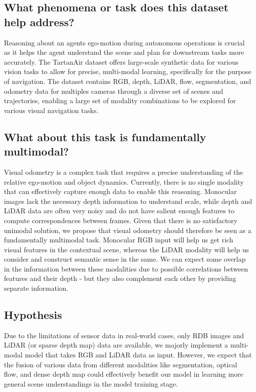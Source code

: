\documentclass[11pt,a4paper]{article}
\begin{document}
\subsection{What phenomena or task does this dataset help address?}
Reasoning about an agents ego-motion during autonomous operations is crucial as it helps the agent understand the scene and plan for downstream tasks more accurately. %
The TartanAir dataset offers large-scale synthetic data for various vision tasks to allow for precise, multi-modal learning, specifically for the purpose of navigation. The dataset contains RGB, depth, LiDAR, flow, segmentation, and odometry data for multiples cameras through a diverse set of scenes and trajectories, enabling a large set of modality combinations to be explored for various visual navigation tasks.

\subsection{What about this task is fundamentally multimodal?}
Visual odometry is a complex task that requires a precise understanding of the relative ego-motion and object dynamics. Currently, there is no single modality that can effectively capture enough data to enable this reasoning. Monocular images lack the necessary depth information to understand scale, while depth and LiDAR data are often very noisy and do not have salient enough features to compute correspondences between frames. Given that there is no satisfactory unimodal solution, we propose that visual odometry should therefore be seen as a fundamentally multimodal task. Monocular RGB input will help us get rich visual features in the contextual scene, whereas the LiDAR modality will help us consider and construct semantic sense in the same. We can expect some overlap in the information between these modalities due to possible correlations between features and their depth - but they also complement each other by providing separate information.

\subsection{Hypothesis}
Due to the limitations of sensor data in real-world cases, only RDB images and LiDAR (or sparse depth map) data are available, we majorly implement a multi-modal model that takes RGB and LiDAR data as input. However, we expect that the fusion of various data from different modalities like segmentation, optical flow, and dense depth map could effectively benefit our model in learning more general scene understandings in the model training stage.
\end{document}
